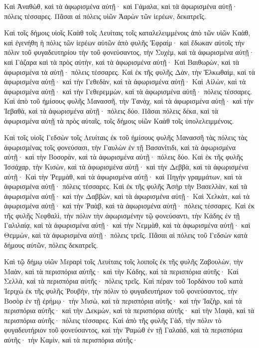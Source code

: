 {Καὶ Ἀναθὼθ, καὶ τὰ ἀφωρισμένα αὐτῇ· καὶ Γάμαλα, καὶ τὰ ἀφωρισμένα αὐτῇ· πόλεις τέσσαρες.
Πᾶσαι αἱ πόλεις υἱῶν Ἀαρὼν τῶν ἱερέων, δεκατρεῖς.
\par }{\PP {}Καὶ τοῖς δήμοις υἱοῖς Καὰθ τοῖς Λευίταις τοῖς καταλελειμμένοις ἀπὸ τῶν υἱῶν Καὰθ, καὶ ἐγενήθη ἡ πόλις τῶν ἱερέων αὐτῶν ἀπὸ φυλῆς Ἐφραίμ·
καὶ ἔδωκαν αὐτοῖς τὴν πόλιν τοῦ φυγαδευτηρίου τὴν τοῦ φονεύσαντος, τὴν Συχὲμ, καὶ τὰ ἀφωρισμένα αὐτῇ· καὶ Γάζαρα καὶ τὰ πρὸς αὐτὴν, καὶ τὰ ἀφωρισμένα αὐτῇ·
Καὶ Βαιθωρὼν, καὶ τὰ ἀφωρισμένα τὰ αὐτῇ· πόλεις τέσσαρες.
Καὶ ἐκ τῆς φυλῆς Δὰν, τὴν Ἑλκωθαὶμ, καὶ τὰ ἀφωρισμένα αὐτῇ· καὶ τὴν Γεθεδὰν, καὶ τὰ ἀφωρισμένα αὐτῇ·
Καὶ Αἰλὼν, καὶ τὰ ἀφωρισμένα αὐτῇ· καὶ τὴν Γεθερεμμὼν, καὶ τὰ ἀφωρισμένα αὐτῇ· πόλεις τέσσαρες.
Καὶ ἀπὸ τοῦ ἡμίσους φυλῆς Μανασσῆ, τὴν Τανὰχ, καὶ τὰ ἀφωρισμένα αὐτῇ· καὶ τὴν Ἰεβαθὰ, καὶ τὰ ἀφωρισμένα αὐτῇ· πόλεις δύο.
Πᾶσαι πόλεις δέκα, καὶ τὰ ἀφωρισμένα αὐτῇ τὰ πρὸς αὐταῖς, τοῖς δήμοις υἱῶν Καὰθ τοῖς ὑπολελειμμένοις.
\par }{\PP {}Καὶ τοῖς υἱοῖς Γεδσὼν τοῖς Λευίταις ἐκ τοῦ ἡμίσους φυλῆς Μανασσῆ τὰς πόλεις τὰς ἀφωρισμένας τοῖς φονεύσασι, τὴν Γαυλὼν ἐν τῇ Βασανίτιδι, καὶ τὰ ἀφωρισμένα αὐτῇ· καὶ τὴν Βοσορὰν, καὶ τὰ ἀφωρισμένα αὐτῇ· πόλεις δύο.
Καὶ ἐκ τῆς φυλῆς Ἰσσάχαρ, τὴν Κισὼν, καὶ τὰ ἀφωρισμένα αὐτῇ· καὶ τὴν Δεββὰ, καὶ τὰ ἀφωρισμένα αὐτῇ·
Καὶ τὴν Ῥεμμὰθ, καὶ τὰ ἀφωρισμένα αὐτῇ· καὶ Πηγὴν γραμμάτων, καὶ τὰ ἀφωρισμένα αὐτῇ· πόλεις τέσσαρες.
Καὶ ἐκ τῆς φυλῆς Ἀσὴρ τὴν Βασελλὰν, καὶ τὰ ἀφωρισμένα αὐτῇ· καὶ τὴν Δαββὼν, καὶ τὰ ἀφωρισμένα αὐτῇ·
Καὶ Χελκὰτ, καὶ τὰ ἀφωρισμένα αὐτῇ· καὶ τὴν Ῥαὰβ, καὶ τὰ ἀφωρισμένα αὐτῇ· πόλεις τέσσαρες.
Καὶ ἐκ τῆς φυλῆς Νεφθαλὶ, τὴν πόλιν τὴν ἀφωρισμένην τῷ φονεύσαντι, τὴν Κάδης ἐν τῇ Γαλιλαίᾳ, καὶ τὰ ἀφωρισμένα αὐτῇ· καὶ τὴν Νεμμὰθ, καὶ τὰ ἀφωρισμένα αὐτῇ· καὶ Θεμμὼν, καὶ τὰ ἀφωρισμένα αὐτῇ· πόλεις τρεῖς.
Πᾶσαι αἱ πόλεις τοῦ Γεδσὼν κατὰ δήμους αὐτῶν, πόλεις δεκατρεῖς.
\par }{\PP {}Καὶ τῷ δήμῳ υἱῶν Μεραρὶ τοῖς Λευίταις τοῖς λοιποῖς ἐκ τῆς φυλῆς Ζαβουλὼν, τὴν Μαὰν, καὶ τὰ περισπόρια αὐτῆς· καὶ τὴν Κάδης, καὶ τὰ περισπόρια αὐτῆς·
Καὶ Σελλὰ, καὶ τὰ περισπόρια αὐτῆς· πόλεις τρεῖς.
Καὶ πέραν τοῦ Ἰορδάνου τοῦ κατὰ Ἰεριχὼ ἐκ τῆς φυλῆς Ῥουβὴν, τὴν πόλιν τὸ φυγαδευτήριον τοῦ φονεύσαντος, τὴν Βοσὸρ ἐν τῇ ἐρήμῳ· τὴν Μισὼ, καὶ τὰ περισπόρια αὐτῆς· καὶ τὴν Ἰαζὴρ, καὶ τὰ περισπόρια αὐτῆς·
καὶ τὴν Δεκμὼν, καὶ τὰ περισπόρια αὐτῆς· καὶ τὴν Μαφὰ, καὶ τὰ περισπόρια αὐτῆς· πόλεις τέσσαρες.
Καὶ ἀπὸ τῆς φυλῆς Γὰδ, τὴν πόλιν τὸ φυγαδευτήριον τοῦ φονεύσαντος, καὶ τὴν Ῥαμὼθ ἐν τῇ Γαλαὰδ, καὶ τὰ περισπόρια αὐτῆς· τὴν Καμὶν, καὶ τὰ περισπόρια αὐτῆς·
}
